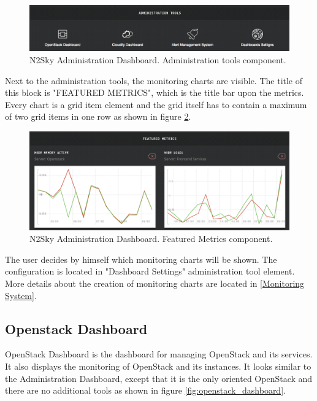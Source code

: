 \begin{figure}[H]
\begin{center}
  \includegraphics[width=\linewidth]{components/4/pics/admin_tools.png}
  \caption{N2Sky Administration Dashboard. Administration tools component.}
  \label{fig:admin_tools}
\end{center}
\end{figure}

Next to the administration tools, the monitoring charts are visible. The title of this block is "FEATURED METRICS", which is the title bar upon the metrics.
Every chart is a grid item element and the grid itself has to contain a maximum of two grid items in one row as shown in figure \ref{fig:featured_metrics}. 
 
\begin{figure}[H]
\begin{center}
  \includegraphics[width=\linewidth]{components/4/pics/featured_metrics.png}
  \caption{N2Sky Administration Dashboard. Featured Metrics component.}
  \label{fig:featured_metrics}
\end{center}
\end{figure}
 
 
The user decides by himself which monitoring charts will be shown. The configuration is located in "Dashboard Settings" administration tool element. More details about the creation of monitoring charts are located in \autoref{Monitoring System}. 


\subsection{Openstack Dashboard}\label{OpenStack Dashboard}

OpenStack Dashboard is the dashboard for managing OpenStack and its services. It also displays the monitoring of OpenStack and its instances. It looks similar to the Administration Dashboard, except that it is the only oriented OpenStack and there are no additional tools as shown in figure \ref{fig:openstack_dashboard}. 

